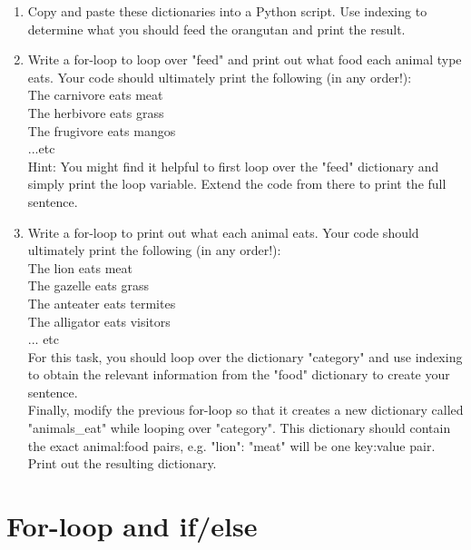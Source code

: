 \documentclass{article}[12pt]
\begin{document}
\begin{enumerate}
	\begin{enumerate}
        \item Copy and paste these dictionaries into a Python script. Use indexing to determine what you should feed the orangutan and print the result.
        \item Write a for-loop to loop over "feed" and print out what food each animal type eats. Your code should ultimately print the following (in any order!):\\
        The carnivore eats meat \\
        The herbivore eats grass \\
        The frugivore eats mangos \\
        ...etc \\
        \noindent Hint: You might find it helpful to first loop over the "feed" dictionary and simply print the loop variable. Extend the code from there to print the full sentence.
        \item Write a for-loop to print out what each animal eats. Your code should ultimately print the following (in any order!):\\
        The lion eats meat \\
        The gazelle eats grass \\ 
        The anteater eats termites \\
        The alligator eats visitors \\ 
            ... etc \\
        \noindent For this task, you should loop over the dictionary "category" and use indexing to obtain the relevant information from the "food" dictionary to create your sentence.
        \\ Finally, modify the previous for-loop so that it creates a new dictionary called "animals\_eat" while looping over "category". This dictionary should contain the exact animal:food pairs, e.g. "lion": "meat" will be one key:value pair. Print out the resulting dictionary.
    \end{enumerate}
\end{enumerate}

		   
\section{For-loop and if/else}
\end{document}
